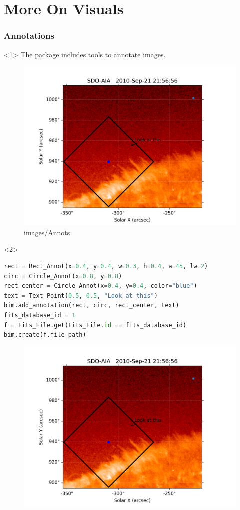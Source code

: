 \documentclass{beamer}
\begin{document}
\section{More On Visuals}
\begin{frame}[fragile]
    \frametitle{Annotations}
\begin{onlyenv}<1>
The package includes tools to annotate images. 
    \begin{figure}[htpb]
        \centering
        \includegraphics[width=0.8\linewidth]{images/annots.png}
        \caption{images/Annots}%
        \label{fig:images/annots}
\end{figure}
\end{onlyenv}
\begin{onlyenv}<2>
\begin{lstlisting}[language=Python]
rect = Rect_Annot(x=0.4, y=0.4, w=0.3, h=0.4, a=45, lw=2)
circ = Circle_Annot(x=0.8, y=0.8)
rect_center = Circle_Annot(x=0.4, y=0.4, color="blue")
text = Text_Point(0.5, 0.5, "Look at this")
bim.add_annotation(rect, circ, rect_center, text)
fits_database_id = 1
f = Fits_File.get(Fits_File.id == fits_database_id)
bim.create(f.file_path)
\end{lstlisting}
    \begin{figure}[htpb]
        \centering
        \includegraphics[width=0.4\linewidth]{images/annots.png}
\end{figure}
\end{onlyenv}
\end{frame}
\end{document}
